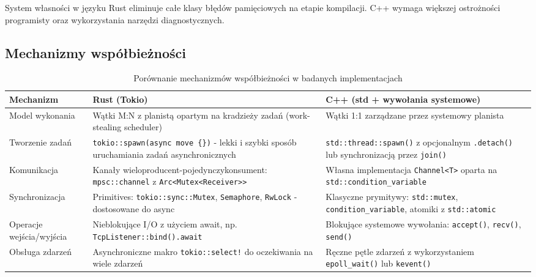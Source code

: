 System własności w języku Rust eliminuje całe klasy błędów pamięciowych na etapie kompilacji. C++ wymaga większej ostrożności programisty oraz wykorzystania narzędzi diagnostycznych.

\subsection{Mechanizmy współbieżności}

\begin{table}[H]
    \centering
    \caption{Porównanie mechanizmów współbieżności w badanych implementacjach}
    \renewcommand{\arraystretch}{1.3}
    \begin{tabularx}{\textwidth}{l>{\raggedright\arraybackslash}X>{\raggedright\arraybackslash}X}
        \toprule
        \textbf{Mechanizm} &
        \textbf{Rust (Tokio)} &
        \textbf{C++ (std + wywołania systemowe)} \\
        \midrule
        Model wykonania &
        Wątki M:N z planistą opartym na kradzieży zadań (work-stealing scheduler) &
        Wątki 1:1 zarządzane przez systemowy planista \\
        \midrule
        Tworzenie zadań &
        \texttt{tokio::spawn(async move \{\})} - lekki i szybki sposób uruchamiania zadań asynchronicznych &
        \texttt{std::thread::spawn()} z opcjonalnym \texttt{.detach()} lub synchronizacją przez \texttt{join()} \\
        \midrule
        Komunikacja &
        Kanały wieloproducent-pojedynczykonsument: \texttt{mpsc::channel} z \texttt{Arc<Mutex<Receiver>>} &
        Własna implementacja \texttt{Channel<T>} oparta na \texttt{std::condition\_variable} \\
        \midrule
        Synchronizacja &
        Primitives: \texttt{tokio::sync::Mutex}, \texttt{Semaphore}, \texttt{RwLock} - dostosowane do async &
        Klasyczne prymitywy: \texttt{std::mutex}, \texttt{condition\_variable}, atomiki z \texttt{std::atomic} \\
        \midrule
        Operacje wejścia/wyjścia &
        Nieblokujące I/O z użyciem await, np. \texttt{TcpListener::bind().await} &
        Blokujące systemowe wywołania: \texttt{accept()}, \texttt{recv()}, \texttt{send()} \\
        \midrule
        Obsługa zdarzeń &
        Asynchroniczne makro \texttt{tokio::select!} do oczekiwania na wiele zdarzeń &
        Ręczne pętle zdarzeń z wykorzystaniem \texttt{epoll\_wait()} lub \texttt{kevent()} \\

\end{tabularx}
\end{table}
